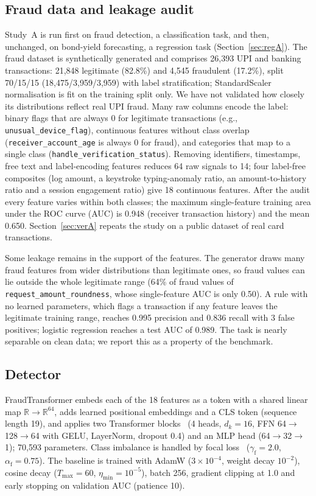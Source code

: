 \documentclass[conference]{IEEEtran}
\begin{document}
\subsection{Fraud data and leakage audit}\label{sec:dataA}
Study~A is run first on fraud detection, a classification task, and then, unchanged, on bond-yield forecasting, a regression task (Section~\ref{sec:regA}). The fraud dataset is synthetically generated and comprises 26,393 UPI and banking transactions: 21,848 legitimate (82.8\%) and 4,545 fraudulent (17.2\%), split 70/15/15 (18,475/3,959/3,959) with label stratification; StandardScaler normalisation is fit on the training split only. We have not validated how closely its distributions reflect real UPI fraud. Many raw columns encode the label: binary flags that are always 0 for legitimate transactions (e.g., \texttt{unusual\_device\_flag}), continuous features without class overlap (\texttt{receiver\_account\_age} is always 0 for fraud), and categories that map to a single class (\texttt{handle\_verification\_status}). Removing identifiers, timestamps, free text and label-encoding features reduces 64 raw signals to 14; four label-free composites (log amount, a keystroke typing-anomaly ratio, an amount-to-history ratio and a session engagement ratio) give 18 continuous features. After the audit every feature varies within both classes; the maximum single-feature training area under the ROC curve (AUC) is 0.948 (receiver transaction history) and the mean 0.650. Section~\ref{sec:verA} repeats the study on a public dataset of real card transactions.

Some leakage remains in the support of the features. The generator draws many fraud features from wider distributions than legitimate ones, so fraud values can lie outside the whole legitimate range (64\% of fraud values of \texttt{request\_amount\_roundness}, whose single-feature AUC is only 0.50). A rule with no learned parameters, which flags a transaction if any feature leaves the legitimate training range, reaches 0.995 precision and 0.836 recall with 3 false positives; logistic regression reaches a test AUC of 0.989. The task is nearly separable on clean data; we report this as a property of the benchmark.

\subsection{Detector}\label{sec:detA}
FraudTransformer embeds each of the 18 features as a token with a shared linear map $\mathbb R\to\mathbb R^{64}$, adds learned positional embeddings and a CLS token (sequence length 19), and applies two Transformer blocks~\cite{vaswani2017} (4 heads, $d_k{=}16$, FFN 64$\to$128$\to$64 with GELU, LayerNorm, dropout 0.4) and an MLP head (64$\to$32$\to$1); 70,593 parameters. Class imbalance is handled by focal loss~\cite{lin2017focal} ($\gamma_{\mathrm f}{=}2.0$, $\alpha_{\mathrm f}{=}0.75$). The baseline is trained with AdamW ($3{\times}10^{-4}$, weight decay $10^{-2}$), cosine decay ($T_{\max}{=}60$, $\eta_{\min}{=}10^{-5}$), batch 256, gradient clipping at 1.0 and early stopping on validation AUC (patience 10).
\end{document}
